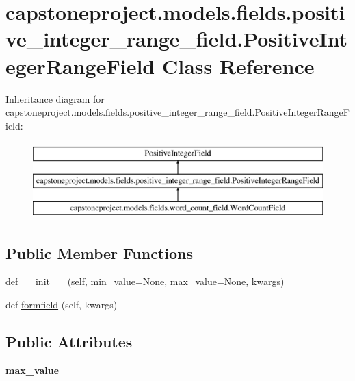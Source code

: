 \hypertarget{classcapstoneproject_1_1models_1_1fields_1_1positive__integer__range__field_1_1_positive_integer_range_field}{}\section{capstoneproject.\+models.\+fields.\+positive\+\_\+integer\+\_\+range\+\_\+field.\+Positive\+Integer\+Range\+Field Class Reference}
\label{classcapstoneproject_1_1models_1_1fields_1_1positive__integer__range__field_1_1_positive_integer_range_field}
Inheritance diagram for capstoneproject.\+models.\+fields.\+positive\+\_\+integer\+\_\+range\+\_\+field.\+Positive\+Integer\+Range\+Field\+:\begin{figure}[H]
\begin{center}
\leavevmode
\includegraphics[height=3.000000cm]{classcapstoneproject_1_1models_1_1fields_1_1positive__integer__range__field_1_1_positive_integer_range_field}
\end{center}
\end{figure}
\subsection*{Public Member Functions}
\begin{DoxyCompactItemize}
\item 
def \mbox{\hyperlink{classcapstoneproject_1_1models_1_1fields_1_1positive__integer__range__field_1_1_positive_integer_range_field_a6bd04fb6777c7945073fa3d47a2d5f4c}{\+\_\+\+\_\+init\+\_\+\+\_\+}} (self, min\+\_\+value=None, max\+\_\+value=None, kwargs)
\item 
def \mbox{\hyperlink{classcapstoneproject_1_1models_1_1fields_1_1positive__integer__range__field_1_1_positive_integer_range_field_a83152e904aee722d94bd2dd6058b85db}{formfield}} (self, kwargs)
\end{DoxyCompactItemize}
\subsection*{Public Attributes}
\begin{DoxyCompactItemize}
\item 
\mbox{\label{classcapstoneproject_1_1models_1_1fields_1_1positive__integer__range__field_1_1_positive_integer_range_field_a06f3bfeed070049595a3736c2730e33c}} 
{\bfseries max\+\_\+value}
\end{DoxyCompactItemize}


